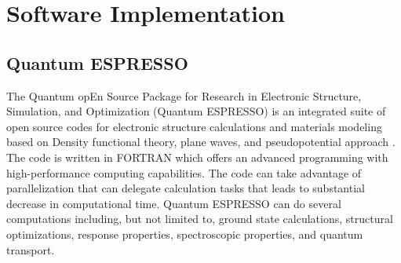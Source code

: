 \chapter{Software Implementation} \label{chap:software}
\section{Quantum ESPRESSO}
The Quantum opEn  Source  Package  for  Research  in  Electronic  Structure, Simulation, and Optimization (Quantum ESPRESSO) is an integrated suite of open source codes for electronic structure calculations and materials modeling based on Density functional theory, plane waves, and pseudopotential approach \citep{Giannozzi2009,Giannozzi2017}. The code is written in FORTRAN which offers an advanced programming with high-performance computing capabilities. The code can take advantage of parallelization that can delegate calculation tasks that leads to substantial decrease in computational time. Quantum ESPRESSO can do several computations including, but not limited to, ground state calculations, structural optimizations, response properties, spectroscopic properties, and quantum transport.

